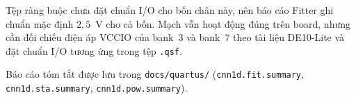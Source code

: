 Tệp ràng buộc chưa đặt chuẩn I/O cho bốn chân này, nên báo cáo Fitter ghi chuẩn mặc định $2{,}5$~V cho cả bốn.
Mạch vẫn hoạt động đúng trên board, nhưng cần đối chiếu điện áp VCCIO của bank~3 và bank~7 theo tài liệu DE10-Lite và đặt chuẩn I/O tương ứng trong tệp \texttt{.qsf}.

\sloppy
Báo cáo tóm tắt được lưu trong \texttt{docs/quartus/} (\texttt{cnn1d.fit.summary}, \texttt{cnn1d.sta.summary}, \texttt{cnn1d.pow.summary}).
